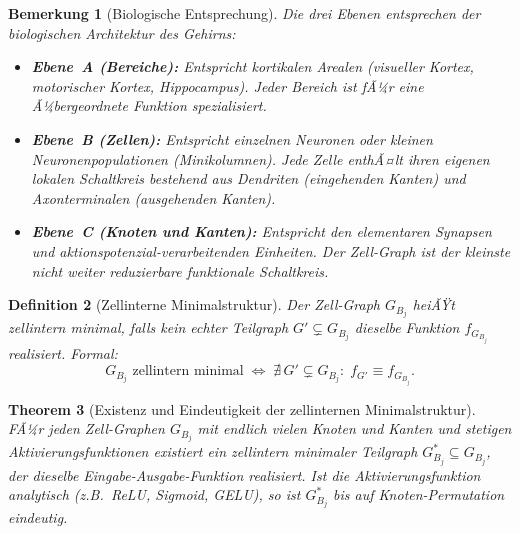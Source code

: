 ﻿\documentclass[12pt, a4paper, openany]{report}
\newtheorem{theorem}{Theorem}[chapter]
\newtheorem{definition}[theorem]{Definition}
\newtheorem{remark}[theorem]{Bemerkung}
\begin{document}
\begin{remark}[Biologische Entsprechung]
Die drei Ebenen entsprechen der biologischen Architektur des Gehirns:
\begin{itemize}
  \item \textbf{Ebene~A (Bereiche):} Entspricht kortikalen Arealen
    (visueller Kortex, motorischer Kortex, Hippocampus).  Jeder Bereich ist
    fÃ¼r eine Ã¼bergeordnete Funktion spezialisiert.
  \item \textbf{Ebene~B (Zellen):} Entspricht einzelnen Neuronen oder kleinen
    Neuronenpopulationen (Minikolumnen).  Jede Zelle enthÃ¤lt ihren eigenen
    lokalen Schaltkreis bestehend aus Dendriten (eingehenden Kanten) und
    Axonterminalen (ausgehenden Kanten).
  \item \textbf{Ebene~C (Knoten und Kanten):} Entspricht den elementaren
    Synapsen und aktionspotenzial-verarbeitenden Einheiten.  Der Zell-Graph
    ist der kleinste nicht weiter reduzierbare funktionale Schaltkreis.
\end{itemize}
\end{remark}

\begin{definition}[Zellinterne Minimalstruktur]
\label{def:cell_minimal}
Der Zell-Graph $G_{B_j}$ heiÃŸt \emph{zellintern minimal}, falls kein echter
Teilgraph $G' \subsetneq G_{B_j}$ dieselbe Funktion $f_{G_{B_j}}$ realisiert.
Formal:
\[
  G_{B_j} \text{ zellintern minimal}
  \;\Leftrightarrow\;
  \nexists\, G' \subsetneq G_{B_j}:\;
  f_{G'} \equiv f_{G_{B_j}}.
\]
\end{definition}

\begin{theorem}[Existenz und Eindeutigkeit der zellinternen Minimalstruktur]
\label{thm:cell_minimal_existence}
FÃ¼r jeden Zell-Graphen $G_{B_j}$ mit endlich vielen Knoten und Kanten und
stetigen Aktivierungsfunktionen existiert ein zellintern minimaler Teilgraph
$G^*_{B_j} \subseteq G_{B_j}$, der dieselbe Eingabe-Ausgabe-Funktion
realisiert.  Ist die Aktivierungsfunktion analytisch (z.B.\ ReLU, Sigmoid,
GELU), so ist $G^*_{B_j}$ bis auf Knoten-Permutation eindeutig.
\end{theorem}
\end{document}
